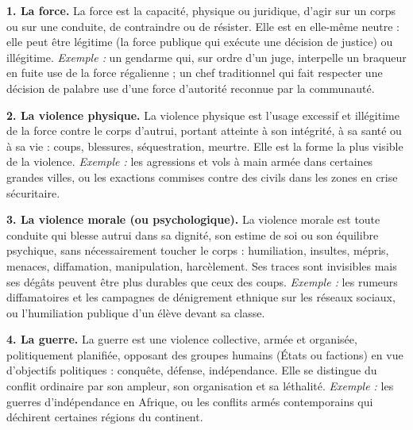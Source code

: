 \documentclass[11pt]{article}
\newcommand{\cle}[1]{{\popxbold\color{popdark}#1}}
\begin{document}
\begin{corrige}

\textbf{1. La force.} La \cle{force} est la capacité, physique ou juridique, d'agir sur un corps ou sur une conduite, de contraindre ou de résister. Elle est en elle-même neutre : elle peut être légitime (la force publique qui exécute une décision de justice) ou illégitime. \emph{Exemple :} un gendarme qui, sur ordre d'un juge, interpelle un braqueur en fuite use de la force régalienne ; un chef traditionnel qui fait respecter une décision de palabre use d'une force d'autorité reconnue par la communauté.

\textbf{2. La violence physique.} La \cle{violence physique} est l'usage excessif et illégitime de la force contre le corps d'autrui, portant atteinte à son intégrité, à sa santé ou à sa vie : coups, blessures, séquestration, meurtre. Elle est la forme la plus visible de la violence. \emph{Exemple :} les agressions et vols à main armée dans certaines grandes villes, ou les exactions commises contre des civils dans les zones en crise sécuritaire.

\textbf{3. La violence morale (ou psychologique).} La \cle{violence morale} est toute conduite qui blesse autrui dans sa dignité, son estime de soi ou son équilibre psychique, sans nécessairement toucher le corps : humiliation, insultes, mépris, menaces, diffamation, manipulation, harcèlement. Ses traces sont invisibles mais ses dégâts peuvent être plus durables que ceux des coups. \emph{Exemple :} les rumeurs diffamatoires et les campagnes de dénigrement ethnique sur les réseaux sociaux, ou l'humiliation publique d'un élève devant sa classe.

\textbf{4. La guerre.} La \cle{guerre} est une violence collective, armée et organisée, politiquement planifiée, opposant des groupes humains (États ou factions) en vue d'objectifs politiques : conquête, défense, indépendance. Elle se distingue du conflit ordinaire par son ampleur, son organisation et sa léthalité. \emph{Exemple :} les guerres d'indépendance en Afrique, ou les conflits armés contemporains qui déchirent certaines régions du continent.

\end{corrige}
\end{document}
